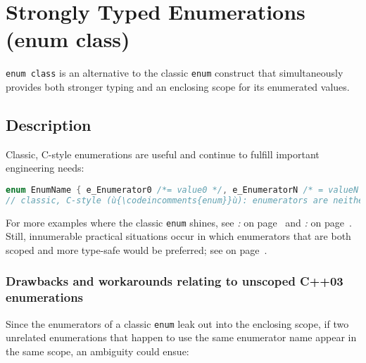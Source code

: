 \newpage
\section[{\tt enum} {\tt class}]{Strongly Typed Enumerations ({\SecCode enum} {\SecCode class})}\label{enumclass}


\texttt{enum}~\texttt{class} is an alternative to the classic
\texttt{enum} construct that simultaneously provides both stronger
typing and an enclosing scope for its enumerated values.

\subsection[Description]{Description}\label{description-enumclass}

Classic, C-style enumerations are useful and continue to fulfill
important engineering needs:

\begin{lstlisting}[language=C++]
enum EnumName { e_Enumerator0 /*= value0 */, e_EnumeratorN /* = valueN */ };
// classic, C-style (ù{\codeincomments{enum}}ù): enumerators are neither type-safe nor scoped
\end{lstlisting}

\noindent For more examples where the classic \texttt{enum} shines, see \textit{: } on page~\pageref{strong-typing-of-an-enum-class-can-be-counterproductive} and \textit{: } on page~\pageref{scoped-enumerations-do-not-necessarily-add-value}. Still,
innumerable practical situations occur in which enumerators that are
both scoped and more type-safe would be preferred; see \textit{} on page~\pageref{introducing-the-c++11-enum-class}.

\subsubsection[Drawbacks and workarounds relating to unscoped C++03 enumerations]{Drawbacks and workarounds relating to unscoped C++03 enumerations}\label{drawbacks-and-workarounds-relating-to-unscoped-c++03-enumerations}

Since the enumerators of a classic \texttt{enum} leak out into the
enclosing scope, if two unrelated enumerations that happen to use the
same enumerator name appear in the same scope, an ambiguity could ensue:

